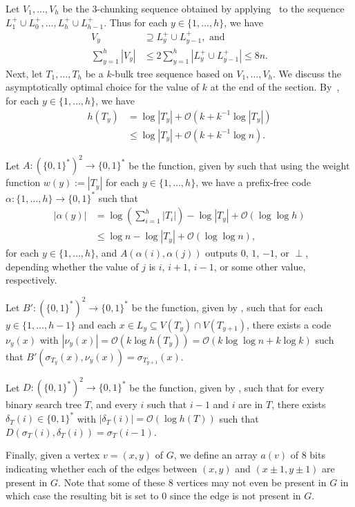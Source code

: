 \documentclass[kpfonts]{patmorin}
\newcommand{\Oh}{\mathcal{O}}
\let\le\leqslant
\let\leq\leqslant
\begin{document}
Let $V_1,\ldots,V_{h}$ be the $3$-chunking sequence obtained by applying~ to the sequence $L^+_{1}\cup L^+_{0},\ldots,L^+_{h}\cup L^+_{h-1}$.
Thus for each $y\in\{1,\ldots,h\}$, we have
\begin{align*}
V_y&\supseteq L^+_{y}\cup L^+_{y-1}, \textrm{ and}\\
\textstyle\sum_{y=1}^h |V_y|&\le 2\textstyle\sum_{y=1}^h |L^+_{y}\cup L^+_{y-1}|\leq 8n.
\end{align*}
Next, let $T_1,\ldots,T_h$ be a $k$-bulk tree sequence based on $V_1,\ldots,V_{h}$.
We discuss the asymptotically optimal choice for the value of $k$ at the end of the section.
By~, for each $y\in\{1,\ldots,h\}$, we have
\begin{align*}
h(T_y)&=\log|T_y| + \Oh(k+k^{-1}\log |T_y|)\\
&\leq\log|T_y| + \Oh(k+k^{-1}\log n).
\end{align*}

Let $A:(\{0,1\}^{*})^2\to\{0,1\}^*$ be the function, given by  such that
using the weight function $w(y):=|T_y|$ for each $y\in\{1,\ldots,h\}$,
we have a prefix-free code $\alpha:\{1,\ldots,h\}\to\{0,1\}^*$ such that
\begin{align*}
|\alpha(y)|&=\log\left(\textstyle\sum_{i=1}^h|T_i|\right) - \log|T_y| + \Oh(\log\log h)\\
&\leq \log n - \log|T_y| + \Oh(\log\log n),
\end{align*}
for each $y\in\{1,\ldots,h\}$, and $A(\alpha(i),\alpha(j))$ outputs $0$, $1$, $-1$, or $\perp$, depending whether the value of $j$ is $i$, $i+1$, $i-1$, or some other value, respectively.


Let $B':(\{0,1\}^{*})^2\to\{0,1\}^*$ be the function, given by , such that
for each $y\in\{1,\ldots,h-1\}$ and each $x\in L_{y}\subseteq V(T_y)\cap V(T_{y+1})$,
there exists a code $\nu_{y}(x)$ with $|\nu_{y}(x)|=\Oh(k\log h(T_{y}))=\Oh(k\log\log n+k \log k)$ such that $B'(\sigma_{T_{y}}(x),\nu_{y}(x))=\sigma_{T_{y+1}}(x)$.

Let $D:(\{0,1\}^{*})^2\to\{0,1\}^*$ be the function, given by , such that for every binary search tree $T$, and every $i$ such that $i-1$ and $i$ are in $T$, there exists $\delta_T(i) \in \{0,1\}^*$ with $|\delta_T(i)|=\Oh(\log h(T))$ such that
$D(\sigma_T(i),\delta_T(i))=\sigma_T(i-1)$.

Finally, given a vertex $v=(x,y)$ of $G$, we define
an array $a(v)$ of $8$ bits indicating whether each of the edges between $(x,y)$ and $(x\pm 1,y\pm 1)$ are present in $G$. Note that some of these $8$ vertices may not even be present in $G$ in which case the resulting bit is set to $0$ since the edge is not present in $G$.
\end{document}
